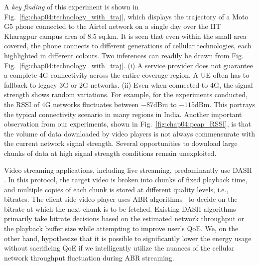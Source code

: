 A \textit{key finding} of this experiment is shown in Fig.~\ref{fig:chap04:technology_with_traj}, which displays the trajectory of a Moto G5 phone connected to the Airtel network on a single day over the IIT Kharagpur campus area of $8.5$ sq.km. It is seen that even within the small area covered, the phone connects to different generations of cellular technologies, each highlighted in different colours. Two inferences can readily be drawn from Fig. Fig.~\ref{fig:chap04:technology_with_traj}. (i) A service provider does not guarantee a complete \ac{4G} connectivity across the entire coverage region. A \ac{UE} often has to fallback to legacy \ac{3G} or \ac{2G} networks. (ii) Even when connected to \ac{4G}, the signal strength shows random variations. For example, for the experiments conducted, the \ac{RSSI} of \ac{4G} networks fluctuates between $-87$dBm to $-115$dBm. This portrays the typical connectivity scenario in many regions in India.
Another important observation from our experiments, shown in Fig.~\ref{fig:chap04:pcap_RSSI}, is that the volume of data downloaded by video players is not always commensurate with the current network signal strength. Several opportunities to download large chunks of data at high signal strength conditions remain unexploited.


\indent Video streaming applications, including live streaming, predominantly use \ac{DASH} \cite{stockhammer2011dynamic}. In this protocol, the target video is broken into chunks of fixed playback time, and multiple copies of each chunk is stored  at different quality levels, i.e., bitrates.  The client side video player uses \ac{ABR} algorithms~\cite{mao2017neural,Spiteri2016,yin2015control,Raca2019,Akhtar2018}
to decide on the  bitrate at which the next chunk is to be fetched. Existing \ac{DASH} algorithms  primarily take bitrate decisions based on the estimated network throughput or the playback buffer size while attempting to improve user's \ac{QoE}. We, on the other hand, hypothesize that it is possible to significantly lower the energy usage without sacrificing \ac{QoE} if we intelligently utilize the nuances of the cellular network throughput fluctuation during ABR streaming.


